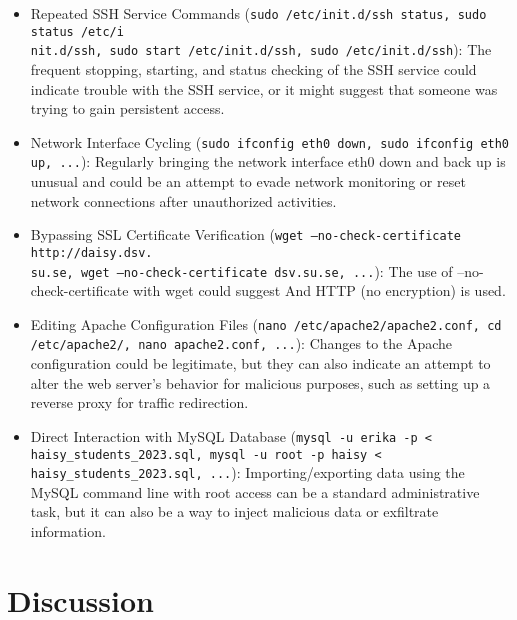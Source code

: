 \begin{itemize}
	\item Repeated SSH Service Commands (\texttt{sudo /etc/init.d/ssh status, sudo status  /etc/i\\nit.d/ssh, sudo start  /etc/init.d/ssh, sudo  /etc/init.d/ssh}): The frequent stopping, starting, and status checking of the SSH service could indicate trouble with the SSH service, or it might suggest that someone was trying to gain persistent access.
	\item Network Interface Cycling (\texttt{sudo ifconfig eth0 down, sudo ifconfig eth0 up, ...}): Regularly bringing the network interface eth0 down and back up is unusual and could be an attempt to evade network monitoring or reset network connections after unauthorized activities.
	\item Bypassing SSL Certificate Verification (\texttt{wget --no-check-certificate http://daisy.dsv.\\su.se, wget --no-check-certificate dsv.su.se, ...}): The use of --no-check-certificate with wget could suggest And HTTP (no encryption) is used.
	\item Editing Apache Configuration Files (\texttt{nano /etc/apache2/apache2.conf, cd /etc/apache2/, nano apache2.conf, ...}): Changes to the Apache configuration could be legitimate, but they can also indicate an attempt to alter the web server's behavior for malicious purposes, such as setting up a reverse proxy for traffic redirection.
	\item Direct Interaction with MySQL Database (\texttt{mysql -u erika -p < haisy\_students\_2023.sql, mysql -u root -p haisy < haisy\_students\_2023.sql, ...}): Importing/exporting data using the MySQL command line with root access can be a standard administrative task, but it can also be a way to inject malicious data or exfiltrate information.
\end{itemize}

\newpage
\section{Discussion}






















